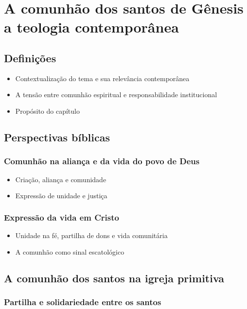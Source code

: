 \newpage
\section{A comunhão dos santos de Gênesis a teologia contemporânea}

\subsection{Definições}
\begin{itemize}
    \item Contextualização do tema e sua relevância contemporânea
    \item A tensão entre comunhão espiritual e responsabilidade institucional
    \item Propósito do capítulo
\end{itemize}

\subsection{Perspectivas bíblicas}
\subsubsection{Comunhão na aliança e da vida do povo de Deus}
\begin{itemize}
  \item Criação, aliança e comunidade
  \item Expressão de unidade e justiça
\end{itemize}

\subsubsection{Expressão da vida em Cristo}
\begin{itemize}
  \item Unidade na fé, partilha de dons e vida comunitária
  \item A comunhão como sinal escatológico
\end{itemize}

\subsection{A comunhão dos santos na igreja primitiva}
\subsubsection{Partilha e solidariedade entre os santos}
